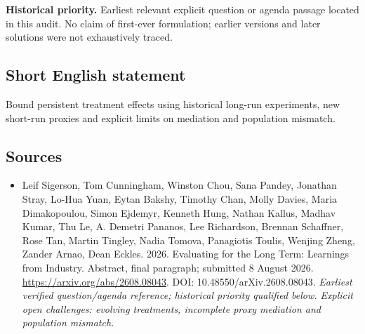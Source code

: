 \documentclass[11pt]{article}
\begin{document}
\par\textbf{Historical priority.} Earliest relevant explicit question or agenda passage located in this audit. No claim of first-ever formulation; earlier versions and later solutions were not exhaustively traced.

\subsection{Short English statement}
Bound persistent treatment effects using historical long-run experiments, new short-run proxies and explicit limits on mediation and population mismatch.

\subsection{Sources}
\begin{itemize}\raggedright
\item[\textnormal{[S1]}]\hypertarget{source:30007711:1}{} Leif Sigerson, Tom Cunningham, Winston Chou, Sana Pandey, Jonathan Stray, Lo-Hua Yuan, Eytan Bakshy, Timothy Chan, Molly Davies, Maria Dimakopoulou, Simon Ejdemyr, Kenneth Hung, Nathan Kallus, Madhav Kumar, Thu Le, A. Demetri Pananos, Lee Richardson, Brennan Schaffner, Rose Tan, Martin Tingley, Nadia Tomova, Panagiotis Toulis, Wenjing Zheng, Zander Arnao, Dean Eckles. 2026. Evaluating for the Long Term: Learnings from Industry. Abstract, final paragraph; submitted 8 August 2026.
\url{https://arxiv.org/abs/2608.08043}.
DOI: 10.48550/arXiv.2608.08043.
{\small\textit{Earliest verified question/agenda reference; historical priority qualified below. Explicit open challenges: evolving treatments, incomplete proxy mediation and population mismatch.}}
\end{itemize}
\end{document}
